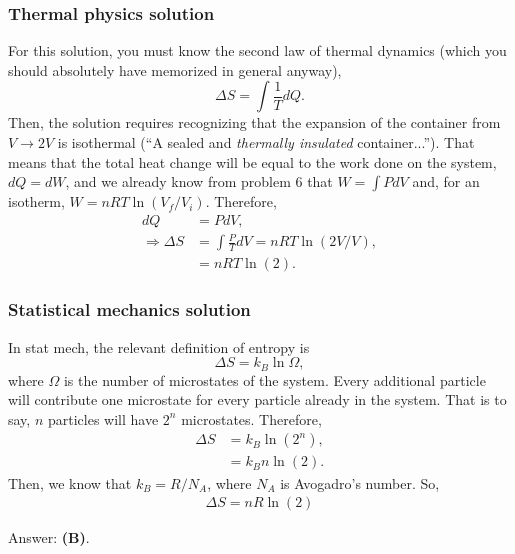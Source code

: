 \documentclass[11pt]{paper}
\newcommand{\answer}[1]{Answer: \textbf{(#1)}.}
\begin{document}
\subsubsection*{Thermal physics solution}
For this solution, you must know the second law of thermal dynamics (which you should absolutely have memorized in general anyway),
\begin{equation}
\Delta S = \int \frac{1}{T}dQ.
\end{equation}
Then, the solution requires recognizing that the expansion of the container from $V\rightarrow2V$ is isothermal (``A sealed and \emph{thermally insulated} container...'').  That means that the total heat change will be equal to the work done on the system, $dQ = dW$, and we already know from problem 6 that $W = \int PdV$ and, for an isotherm, $W = nRT\ln(V_f/V_i)$.  Therefore,
\begin{align}
dQ &= PdV,\\
\Rightarrow \Delta S &= \int \frac{P}{T}dV = nRT\ln(2V/V),\\
&= nRT\ln(2). 
\end{align}
\subsubsection*{Statistical mechanics solution}
In stat mech, the relevant definition of entropy is
\begin{equation}
\Delta S = k_B \ln\Omega,
\end{equation}
where $\Omega$ is the number of microstates of the system.  Every additional particle will contribute one microstate for every particle already in the system.  That is to say, $n$ particles will have $2^n$ microstates.  Therefore,
\begin{align}
\Delta S &= k_B \ln\left(2^n\right),\\
&= k_B n\ln(2).
\end{align}
Then, we know that $k_B = R/N_A$, where $N_A$ is Avogadro's number.  So,
\begin{align}
\Delta S = nR\ln(2)
\end{align}

\answer{B}
\end{document}

